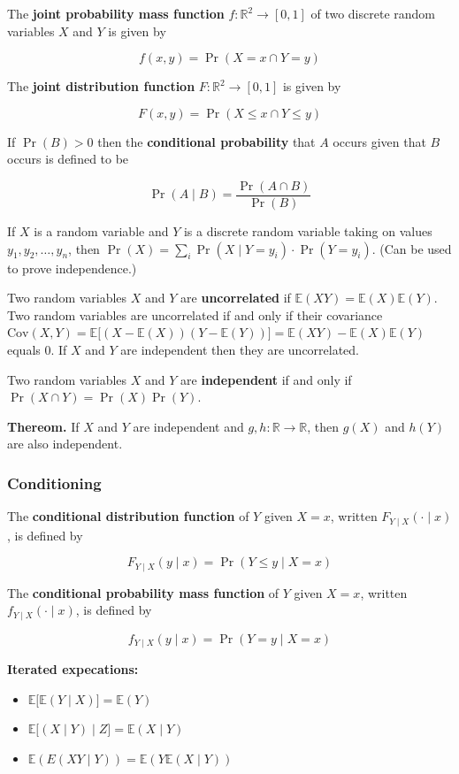 \documentclass{article}
\newcommand{\E}{\mathbb{E}}
\newcommand{\Cov}{\mathrm{Cov}}
\begin{document}
The \textbf{joint probability mass function} \(f: \mathbb{R}^2 \to [0, 1]\) of two discrete random variables \(X\) and \(Y\) is given by

\[
f(x, y) = \Pr(X = x \cap Y = y)
\]

The \textbf{joint distribution function} \(F: \mathbb{R}^2 \to [0, 1]\) is given by

\[
F(x, y) = \Pr(X \leq x \cap Y \leq y)
\]

If \(\Pr(B) > 0\) then the \textbf{conditional probability} that \(A\) occurs given that \(B\) occurs is defined to be

\[
\Pr(A \mid B) = \frac{\Pr(A \cap B)}{\Pr(B)}
\]

If \(X\) is a random variable and \(Y\) is a discrete random variable taking on values \(y_1, y_2, \ldots, y_n\), then \(\Pr(X) = \sum_i \Pr(X \mid Y = y_i) \cdot \Pr(Y = y_i)\). (Can be used to prove independence.)

Two random variables \(X\) and \(Y\) are \textbf{uncorrelated} if \(\E(XY) = \E(X) \E(Y)\). Two random variables are uncorrelated if and only if their covariance \(\Cov(X, Y) = \E \big[(X - \E(X))(Y - \E(Y))\big] = \E(XY) - \E(X)\E(Y)\)  equals 0. If \(X\) and \(Y\) are independent then they are uncorrelated.

Two random variables \(X\) and \(Y\) are \textbf{independent} if and only if \(\Pr(X \cap Y) = \Pr(X) \Pr(Y)\).

\textbf{Thereom.} If \(X\) and \(Y\) are independent and \(g, h: \mathbb{R} \to \mathbb{R}\), then \(g(X)\) and \(h(Y)\) are also independent.

\subsubsection{Conditioning}

The \textbf{conditional distribution function} of \(Y\) given \(X = x\), written \(F_{Y\mid X}( \cdot \mid x)\), is defined by

\[
F_{Y\mid X}( y \mid x) = \Pr(Y \leq y \mid X = x)
\]

The \textbf{conditional probability mass function} of \(Y\) given \(X = x\), written \(f_{Y\mid X}( \cdot \mid x)\), is defined by

\[
f_{Y\mid X}( y \mid x) = \Pr(Y = y \mid X = x)
\]

\textbf{Iterated expecations:} 

\begin{itemize}

\item \(\E\big[ \E(Y \mid X) \big] = \E(Y)\)

\item \(\E \big[ (X \mid Y) \mid Z \big] = \E(X \mid Y)\)

\item \( \E(E(XY \mid Y)) = \E(Y \E(X \mid Y))\)

\end{itemize}
\end{document}
